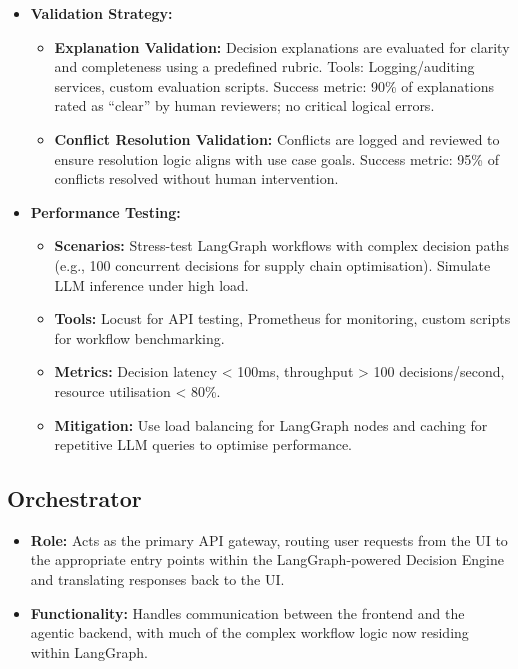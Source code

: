 \documentclass{article}
\begin{document}
\begin{itemize}
    \item \textbf{Validation Strategy:}
        \begin{itemize}
            \item \textbf{Explanation Validation:} Decision explanations are evaluated for clarity and completeness using a predefined rubric. Tools: Logging/auditing services, custom evaluation scripts. Success metric: 90\% of explanations rated as ``clear'' by human reviewers; no critical logical errors.
            \item \textbf{Conflict Resolution Validation:} Conflicts are logged and reviewed to ensure resolution logic aligns with use case goals. Success metric: 95\% of conflicts resolved without human intervention.
        \end{itemize}
    \item \textbf{Performance Testing:}
        \begin{itemize}
            \item \textbf{Scenarios:} Stress-test LangGraph workflows with complex decision paths (e.g., 100 concurrent decisions for supply chain optimisation). Simulate LLM inference under high load.
            \item \textbf{Tools:} Locust for API testing, Prometheus for monitoring, custom scripts for workflow benchmarking.
            \item \textbf{Metrics:} Decision latency < 100ms, throughput > 100 decisions/second, resource utilisation < 80\%.
            \item \textbf{Mitigation:} Use load balancing for LangGraph nodes and caching for repetitive LLM queries to optimise performance.
        \end{itemize}
\end{itemize}

\subsection{Orchestrator}
\begin{itemize}
    \item \textbf{Role:} Acts as the primary API gateway, routing user requests from the UI to the appropriate entry points within the LangGraph-powered Decision Engine and translating responses back to the UI.
    \item \textbf{Functionality:} Handles communication between the frontend and the agentic backend, with much of the complex workflow logic now residing within LangGraph.
\end{itemize}
\end{document}
